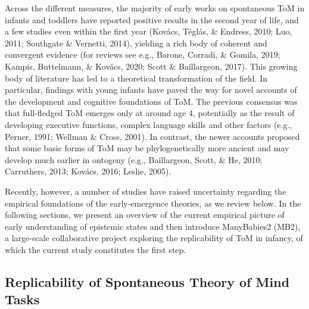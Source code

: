 \documentclass[
  man,floatsintext]{apa6}
\begin{document}
Across the different measures, the majority of early works on spontaneous ToM in infants and toddlers have reported positive results in the second year of life, and a few studies even within the first year (Kovács, Téglás, \& Endress, 2010; Luo, 2011; Southgate \& Vernetti, 2014), yielding a rich body of coherent and convergent evidence (for reviews see e.g., Barone, Corradi, \& Gomila, 2019; Kampis, Buttelmann, \& Kovács, 2020; Scott \& Baillargeon, 2017). This growing body of literature has led to a theoretical transformation of the field. In particular, findings with young infants have paved the way for novel accounts of the development and cognitive foundations of ToM. The previous consensus was that full-fledged ToM emerges only at around age 4, potentially as the result of developing executive functions, complex language skills and other factors (e.g., Perner, 1991; Wellman \& Cross, 2001). In contrast, the newer accounts proposed that some basic forms of ToM may be phylogenetically more ancient and may develop much earlier in ontogeny (e.g., Baillargeon, Scott, \& He, 2010; Carruthers, 2013; Kovács, 2016; Leslie, 2005).

Recently, however, a number of studies have raised uncertainty regarding the empirical foundations of the early-emergence theories, as we review below. In the following sections, we present an overview of the current empirical picture of early understanding of epistemic states and then introduce ManyBabies2 (MB2), a large-scale collaborative project exploring the replicability of ToM in infancy, of which the current study constitutes the first step.

\subsection{Replicability of Spontaneous Theory of Mind Tasks}\label{replicability-of-spontaneous-theory-of-mind-tasks}
\end{document}

